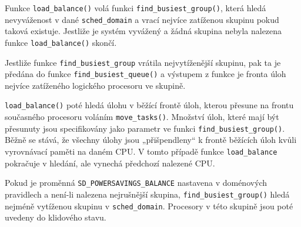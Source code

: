 \documentclass[a4paper,12pt]{article}
\begin{document}
Funkce \verb#load_balance()# volá funkci \verb#find_busiest_group()#, která hledá nevyváženost v dané \verb#sched_domain# a vrací nejvíce zatíženou skupinu pokud taková existuje. Jestliže je systém vyvážený a žádná skupina nebyla nalezena funkce \verb#load_balance()# skončí.

Jestliže funkce \verb#find_busiest_group# vrátila nejvytíženější skupinu, pak ta je předána do funkce \verb#find_busiest_queue()# a výstupem z funkce je fronta úloh nejvíce zatíženého logického procesoru ve skupině.

\verb#load_balance()# poté hledá úlohu v běžící frontě úloh, kterou přesune na frontu současného procesoru voláním \verb#move_tasks()#. Množství úloh, které mají být přesunuty jsou specifikovány jako parametr ve funkci \verb#find_busiest_group()#. Běžně se stává, že všechny úlohy jsou „přišpendleny“ k frontě běžících úloh kvůli vyrovnávací paměti na daném CPU. V tomto případě funkce \verb#load_balance# pokračuje v hledání, ale vynechá předchozí nalezené CPU.

Pokud je proměnná \verb#SD_POWERSAVINGS_BALANCE# nastavena v doménových pravidlech a není-li nalezena nejrušnější skupina, \verb#find_busiest_group()# hledá nejméně vytíženou skupinu v \verb#sched_domain#. Procesory v této skupině jsou poté uvedeny do klidového stavu. 
\end{document}
